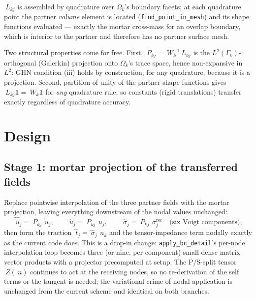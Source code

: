 \documentclass[11pt]{article}
\begin{document}
$~L_{kj}$ is assembled by quadrature over $\Omega_k$'s boundary facets;
at each quadrature point the partner \emph{volume} element is located
(\texttt{find\_point\_in\_mesh}) and its shape functions evaluated ---
exactly the mortar cross-mass for an overlap boundary, which is
interior to the partner and therefore has no partner surface mesh.

Two structural properties come for free.  First,
$~P_{kj} = ~W_k^{-1} ~L_{kj}$ is the $L^2(\Gamma_k)$-orthogonal
(Galerkin) projection onto $\Omega_k$'s trace space, hence
non-expansive in $L^2$: GHN condition (iii) holds by construction,
for any quadrature, because it is a projection.  Second, partition of
unity of the partner shape functions gives
$~L_{kj} \mathbf{1} = ~W_k \mathbf{1}$ for \emph{any} quadrature rule,
so constants (rigid translations) transfer exactly regardless of
quadrature accuracy.

\section{Design}

\subsection{Stage 1: mortar projection of the transferred fields}

Replace pointwise interpolation of the three partner fields with the
mortar projection, leaving everything downstream of the nodal values
unchanged:
\begin{equation}
  \hat{\dot{~u}}_j = ~P_{kj}\, \dot{~u}_j, \qquad
  \hat{~u}_j = ~P_{kj}\, ~u_j, \qquad
  \hat{~\sigma}_j = ~P_{kj}\, ~\sigma_j^{\mathrm{rec}}
  \quad \text{(six Voigt components),}
  \label{eq:stage1}
\end{equation}
then form the traction $\hat{~t}_j = \hat{~\sigma}_j\, ~n_k$ and the
tensor-impedance term nodally exactly as the current code does.  This
is a drop-in change: \texttt{apply\_bc\_detail}'s per-node
interpolation loop becomes three (or nine, per component) small dense
matrix--vector products with a projector precomputed at setup.  The
P/S-split tensor $~Z(~n)$ continues to act at the receiving nodes, so
no re-derivation of the self terms or the tangent is needed; the
variational crime of nodal application is unchanged from the current
scheme and identical on both branches.
\end{document}
